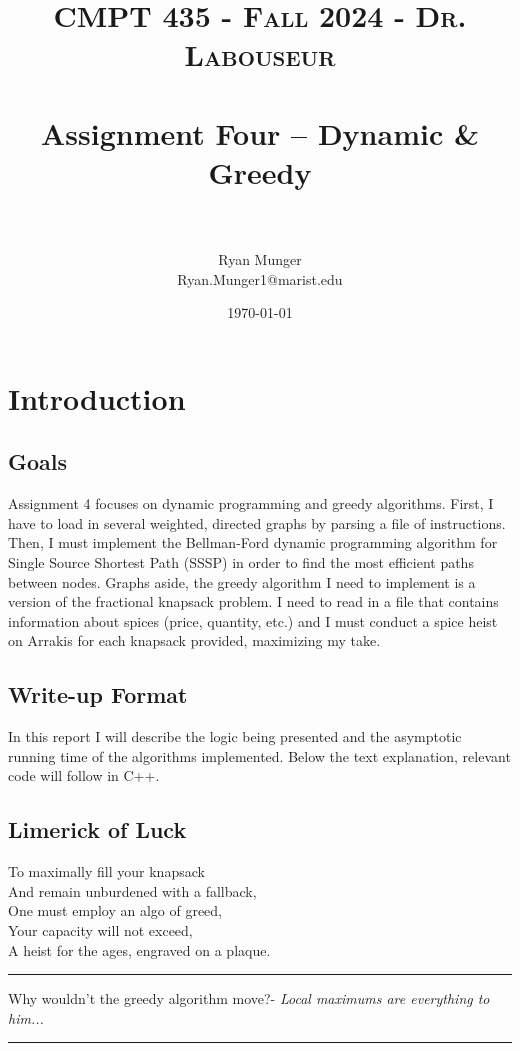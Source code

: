 \documentclass[letterpaper, 10pt]{article}
\title{	
   \normalfont \normalsize 
   \textsc{CMPT 435 - Fall 2024 - Dr. Labouseur} \\[10pt] %
   \horrule{0.5pt} \\[0.25cm] 	%
   \huge Assignment Four -- Dynamic \& Greedy\\     	    %
   \horrule{0.5pt} \\[0.25cm] 	%
}
\author{Ryan Munger \\ \normalsize Ryan.Munger1@marist.edu}
\date{\normalsize\today} 	%
\begin{document}
\maketitle %


\section{Introduction}
\subsection{Goals}
Assignment 4 focuses on dynamic programming and greedy algorithms. First, I have to load in several weighted, directed graphs by parsing a file of instructions. Then, I must implement the Bellman-Ford dynamic programming algorithm	for Single Source Shortest Path (SSSP) in order to find the most efficient paths between nodes. Graphs aside, the greedy algorithm I need to implement is a version of the fractional knapsack problem. I need to read in a file that contains information about spices (price, quantity, etc.) and I must conduct a spice heist on Arrakis for each knapsack provided, maximizing my take.
\subsection{Write-up Format}
    In this report I will describe the logic being presented and the asymptotic running time of the algorithms implemented. Below the text explanation, relevant code will follow in C++. 
\subsection{Limerick of Luck}
\noindent
To maximally fill your knapsack \\
And remain unburdened with a fallback, \\
    \hspace*{1.5em}One must employ an algo of greed, \\
    \hspace*{1.5em}Your capacity will not exceed, \\
A heist for the ages, engraved on a plaque. \\
\newpage
\hrule
\vspace{.25cm}
Why wouldn't the greedy algorithm move?- \textit{Local maximums are everything to him...}\\
\hrule
\vspace{.25cm}
\end{document}
